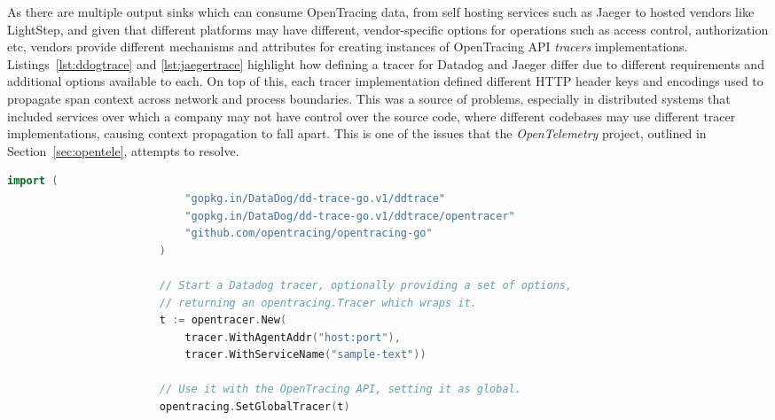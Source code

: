 \documentclass[12pt,pdftex,titlepage]{report}
\begin{document}
                As there are multiple output sinks which can consume OpenTracing data, from self hosting services such as Jaeger to hosted vendors like LightStep, and given that
                different platforms may have different, vendor-specific options for operations such as access control, authorization etc, vendors provide different mechanisms
                and attributes for creating instances of OpenTracing API \textit{tracers} implementations. Listings~\ref{lst:ddogtrace} and \ref{lst:jaegertrace} highlight how defining a tracer
                for Datadog and Jaeger differ due to different requirements and additional options available to each. On top of this, each tracer implementation defined different HTTP header 
                keys and encodings used to propagate span context across network and process boundaries. This was a source of problems, especially in distributed systems
                that included services over which a company may not have control over the source code, where different codebases may use different tracer implementations, causing context
                propagation to fall apart. This is one of the issues that the \textit{OpenTelemetry} project, outlined in Section~\ref{sec:opentele}, attempts to resolve.

                \medskip
                \begin{spacing}{1.0}
                    \begin{lstlisting}[caption={[Example Go snippet of instatiating a Datadog tracer]Example Go snippet of instatiating a Datadog OpenTracing compatible tracer.}, 
                        language=Go, gobble=24, label={lst:ddogtrace}]
                        import (
                            "gopkg.in/DataDog/dd-trace-go.v1/ddtrace"
                            "gopkg.in/DataDog/dd-trace-go.v1/ddtrace/opentracer"
                            "github.com/opentracing/opentracing-go"
                        )

                        // Start a Datadog tracer, optionally providing a set of options,
                        // returning an opentracing.Tracer which wraps it.
                        t := opentracer.New(
                            tracer.WithAgentAddr("host:port"),
                            tracer.WithServiceName("sample-text"))

                        // Use it with the OpenTracing API, setting it as global.
                        opentracing.SetGlobalTracer(t)
                    \end{lstlisting}
                \end{spacing}
\end{document}
